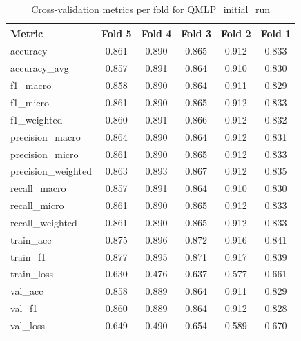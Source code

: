 \documentclass[runningheads]{llncs}
\begin{document}
\begin{table}[t]
\centering
\caption{Cross-validation metrics per fold for QMLP\_initial\_run}
\begin{tabular}{lccccc}
\hline
Metric & Fold 5 & Fold 4 & Fold 3 & Fold 2 & Fold 1 \\
\hline
accuracy & 0.861 & 0.890 & 0.865 & 0.912 & 0.833 \\
accuracy\_avg & 0.857 & 0.891 & 0.864 & 0.910 & 0.830 \\
f1\_macro & 0.858 & 0.890 & 0.864 & 0.911 & 0.829 \\
f1\_micro & 0.861 & 0.890 & 0.865 & 0.912 & 0.833 \\
f1\_weighted & 0.860 & 0.891 & 0.866 & 0.912 & 0.832 \\
precision\_macro & 0.864 & 0.890 & 0.864 & 0.912 & 0.831 \\
precision\_micro & 0.861 & 0.890 & 0.865 & 0.912 & 0.833 \\
precision\_weighted & 0.863 & 0.893 & 0.867 & 0.912 & 0.835 \\
recall\_macro & 0.857 & 0.891 & 0.864 & 0.910 & 0.830 \\
recall\_micro & 0.861 & 0.890 & 0.865 & 0.912 & 0.833 \\
recall\_weighted & 0.861 & 0.890 & 0.865 & 0.912 & 0.833 \\
train\_acc & 0.875 & 0.896 & 0.872 & 0.916 & 0.841 \\
train\_f1 & 0.877 & 0.895 & 0.871 & 0.917 & 0.839 \\
train\_loss & 0.630 & 0.476 & 0.637 & 0.577 & 0.661 \\
val\_acc & 0.858 & 0.889 & 0.864 & 0.911 & 0.829 \\
val\_f1 & 0.860 & 0.889 & 0.864 & 0.912 & 0.828 \\
val\_loss & 0.649 & 0.490 & 0.654 & 0.589 & 0.670 \\
\hline
\end{tabular}
\end{table}
\end{document}
